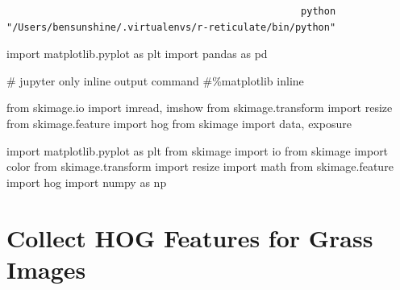 \documentclass[
  letterpaper,
  DIV=11,
  numbers=noendperiod]{scrreprt}
\newenvironment{Shaded}{\begin{snugshade}}{\end{snugshade}}
\newcommand{\CommentTok}[1]{\textcolor[rgb]{0.37,0.37,0.37}{#1}}
\newcommand{\ImportTok}[1]{\textcolor[rgb]{0.00,0.46,0.62}{#1}}
\newcommand{\NormalTok}[1]{\textcolor[rgb]{0.00,0.23,0.31}{#1}}
\begin{document}
\begin{verbatim}
                                                   python 
"/Users/bensunshine/.virtualenvs/r-reticulate/bin/python" 
\end{verbatim}

\begin{Shaded}
\begin{Highlighting}[]

\ImportTok{import}\NormalTok{ matplotlib.pyplot }\ImportTok{as}\NormalTok{ plt}
\ImportTok{import}\NormalTok{ pandas }\ImportTok{as}\NormalTok{ pd}

\CommentTok{\# jupyter only inline output command}
\CommentTok{\#\%matplotlib inline}

\ImportTok{from}\NormalTok{ skimage.io }\ImportTok{import}\NormalTok{ imread, imshow}
\ImportTok{from}\NormalTok{ skimage.transform }\ImportTok{import}\NormalTok{ resize}
\ImportTok{from}\NormalTok{ skimage.feature }\ImportTok{import}\NormalTok{ hog}
\ImportTok{from}\NormalTok{ skimage }\ImportTok{import}\NormalTok{ data, exposure}


\ImportTok{import}\NormalTok{ matplotlib.pyplot }\ImportTok{as}\NormalTok{ plt}
\ImportTok{from}\NormalTok{ skimage }\ImportTok{import}\NormalTok{ io}
\ImportTok{from}\NormalTok{ skimage }\ImportTok{import}\NormalTok{ color}
\ImportTok{from}\NormalTok{ skimage.transform }\ImportTok{import}\NormalTok{ resize}
\ImportTok{import}\NormalTok{ math}
\ImportTok{from}\NormalTok{ skimage.feature }\ImportTok{import}\NormalTok{ hog}
\ImportTok{import}\NormalTok{ numpy }\ImportTok{as}\NormalTok{ np}
\end{Highlighting}
\end{Shaded}

\section{Collect HOG Features for Grass
Images}\label{collect-hog-features-for-grass-images}
\end{document}
